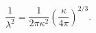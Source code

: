 \begin{equation}
\frac{1}{\lambda^{2}} = \frac{1}{2 \pi \kappa^{2}} 
                        \left( \frac{\kappa}{4 \pi} \right)^{2/3}.
\end{equation} 
